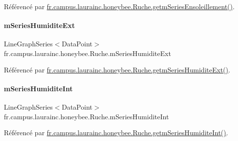 Référencé par \hyperlink{classfr_1_1campus_1_1laurainc_1_1honeybee_1_1_ruche_afb6dfa76b8c8c35151face6a5fe32044}{fr.\+campus.\+laurainc.\+honeybee.\+Ruche.\+getm\+Series\+Ensoleillement()}.

\mbox{\label{classfr_1_1campus_1_1laurainc_1_1honeybee_1_1_ruche_abe6075db6a4cd92a43a0972514b4b552}} 
\paragraph{\texorpdfstring{m\+Series\+Humidite\+Ext}{mSeriesHumiditeExt}}
{\footnotesize\ttfamily Line\+Graph\+Series$<$Data\+Point$>$ fr.\+campus.\+laurainc.\+honeybee.\+Ruche.\+m\+Series\+Humidite\+Ext\hspace{0.3cm}{\ttfamily [private]}}



Référencé par \hyperlink{classfr_1_1campus_1_1laurainc_1_1honeybee_1_1_ruche_ad1868fa7a9c8f7840e224b06eb03dac9}{fr.\+campus.\+laurainc.\+honeybee.\+Ruche.\+getm\+Series\+Humidite\+Ext()}.

\mbox{\label{classfr_1_1campus_1_1laurainc_1_1honeybee_1_1_ruche_af36001cde96599deef784d3be498ae65}} 
\paragraph{\texorpdfstring{m\+Series\+Humidite\+Int}{mSeriesHumiditeInt}}
{\footnotesize\ttfamily Line\+Graph\+Series$<$Data\+Point$>$ fr.\+campus.\+laurainc.\+honeybee.\+Ruche.\+m\+Series\+Humidite\+Int\hspace{0.3cm}{\ttfamily [private]}}



Référencé par \hyperlink{classfr_1_1campus_1_1laurainc_1_1honeybee_1_1_ruche_a2b57090da3912989bbfcc04a76f9e651}{fr.\+campus.\+laurainc.\+honeybee.\+Ruche.\+getm\+Series\+Humidite\+Int()}.

